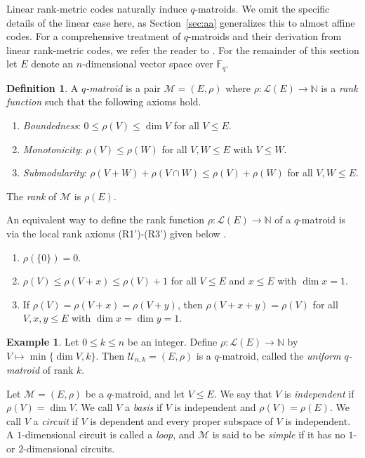 \documentclass[a4paper,11pt,reqno]{article}
\newcommand{\F}{\mathbb{F}}
\renewcommand{\L}{\mathcal{L}}
\newcommand{\M}{\mathcal{M}}
\newcommand{\NN}{\mathbb N}
\theoremstyle{plain} \numberwithin{equation}{section}
\theoremstyle{definition}
\newtheorem{definition}[theorem]{Definition}
\newtheorem{example}[theorem]{Example}
\begin{document}
Linear rank-metric codes naturally induce $q$-matroids. We omit the specific details of the linear case here, as Section~\ref{sec:aa} generalizes this to almost affine codes. For a comprehensive treatment of $q$-matroids and their derivation from linear rank-metric codes, we refer the reader to \cite{DBLP:journals/corr/abs-2104-06570, BYRNE2022149, BYRNE2024105799, vertigan}. {For the remainder of this section let $E$ denote an $n$-dimensional vector space over $\F_q$.}

\begin{definition} A \textit{$q$-matroid} is a pair $\mathcal{M} = (E,\rho)$ where $\rho\colon \mathcal{L} (E) \rightarrow \mathbb{N}$ is a \textit{rank function} such that the following axioms hold.
\begin{enumerate}
    \item[(R1)] \textit{Boundedness}: $0\leq \rho(V) \leq \dim V$ for all $V\leq E$.
    \item[(R2)] \textit{Monotonicity}: $\rho(V)\leq \rho(W)$ for all $V,W\leq E$ with $V\leq W$.
    \item[(R3)] \textit{Submodularity}: $\rho(V + W) + \rho(V\cap W ) \leq \rho(V) + \rho(W)$ for all $V,W\leq E$.
\end{enumerate}
The \emph{rank} of $\M$ is $\rho(E)$. \label{def:qmatroid}
\end{definition}

An equivalent way to define the rank function $\rho\colon \L(E)\rightarrow \mathbb{N}$ of a $q$-matroid is via the local rank axioms (R1')-(R3') given below \cite{BYRNE2022149}.

\begin{enumerate}
    \item[(R1')] $\rho(\{0\})=0$.
    \item[(R2')] $\rho(V) \leq \rho(V+x) \leq \rho(V)+1$ for all $V\leq E$ and $x\leq E$ with $\dim x =1$.
    \item[(R3')] If $\rho(V) = \rho(V+x) = \rho(V+y)$, then $\rho(V+x+y)=\rho(V)$ for all $V,x,y\leq E$ with $\dim x = \dim y=1$.
\end{enumerate}

{
\begin{example}
    Let $0\leq k \leq n$ be an integer. Define $\rho\colon \L(E) \rightarrow \NN$ by $V\mapsto \min\{ \dim V, k\}$. Then $\mathcal{U}_{n,k} = (E,\rho)$ is a $q$-matroid, called the \emph{uniform $q$-matroid} of rank $k$.
\end{example}}

Let $\mathcal{M}=(E,\rho)$ be a $q$-matroid, and let $V \leq E$. We say that $V$ is \emph{independent} if $\rho(V)=\dim V$. We call $V$ a \emph{basis} if $V$ is independent and $\rho(V)=\rho(E)$. We call $V$ a \emph{circuit} if $V$ is dependent and every proper subspace of $V$ is independent. A $1$-dimensional circuit is called a \emph{loop}, and $\mathcal{M}$ is said to be \emph{simple} if it has no $1$- or $2$-dimensional circuits.
\end{document}
